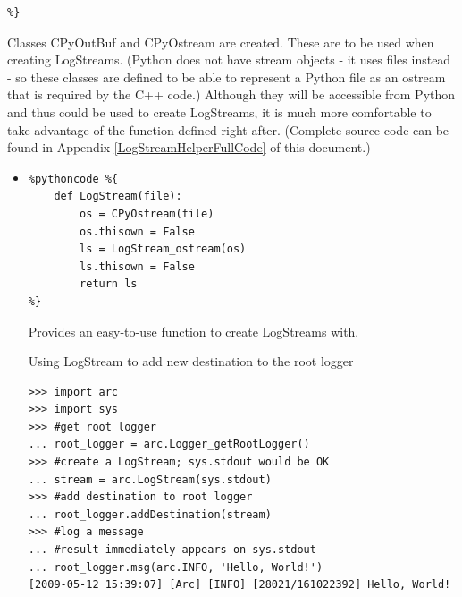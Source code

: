 \documentclass{article}
\begin{document}
\begin{flushleft}
\begin{itemize}
{\begin{verbatim}
%}
\end{verbatim}
  Classes CPyOutBuf and CPyOstream are created. These are to be used when creating LogStreams.
  (Python does not have stream objects - it uses files instead - so these classes are defined 
   to be able to represent a Python file as an ostream that is required by the C++ code.)
  Although they will be accessible from Python and thus could be used to create LogStreams,
  it is much more comfortable to take advantage of the function defined right after.
  (Complete source code can be found in Appendix \ref{LogStreamHelperFullCode} of this document.)
  }
\end{itemize}
\begin{itemize}
  \item{\begin{verbatim}
%pythoncode %{
    def LogStream(file):
        os = CPyOstream(file)
        os.thisown = False
        ls = LogStream_ostream(os)
        ls.thisown = False
        return ls
%}
\end{verbatim}
  Provides an easy-to-use function to create LogStreams with.
    \begin{example}
      \caption{Using LogStream to add new destination to the root logger}\label{logstream}
\begin{verbatim}
>>> import arc
>>> import sys
>>> #get root logger
... root_logger = arc.Logger_getRootLogger()
>>> #create a LogStream; sys.stdout would be OK
... stream = arc.LogStream(sys.stdout)
>>> #add destination to root logger
... root_logger.addDestination(stream)
>>> #log a message
... #result immediately appears on sys.stdout
... root_logger.msg(arc.INFO, 'Hello, World!')
[2009-05-12 15:39:07] [Arc] [INFO] [28021/161022392] Hello, World!
\end{verbatim}
    \end{example}
  }
\end{itemize}
\end{flushleft}

\end{document}
